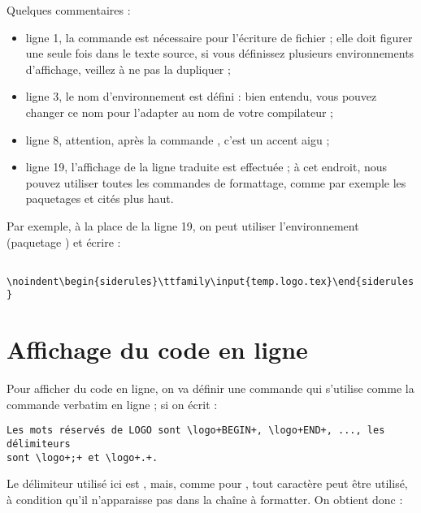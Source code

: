 Quelques commentaires :
\begin{itemize}
  \item ligne 1, la commande  est nécessaire pour l'écriture de fichier ; elle doit figurer une seule fois dans le texte source, si vous définissez plusieurs environnements d'affichage, veillez à ne pas la dupliquer ; 
  \item ligne 3, le nom d'environnement est défini : bien entendu, vous pouvez changer ce nom pour l'adapter au nom de votre compilateur ;
  \item ligne 8, attention, après la commande , c'est un accent aigu \tpp{\`{}} ;
  \item ligne 19, l'affichage de la ligne traduite est effectuée ; à cet endroit, nous pouvez utiliser toutes les commandes de formattage, comme par exemple les paquetages  et  cités plus haut.
\end{itemize}

Par exemple, à la place de la ligne 19, on peut utiliser l'environnement  (paquetage ) et écrire :

\texttt{
\textbackslash noindent\textbackslash begin\{siderules\}\textbackslash ttfamily\textbackslash input\{temp.logo.tex\}\textbackslash end\{siderules\}
}












\section{Affichage du code en ligne}

Pour afficher du code en ligne, on va définir une commande  qui s'utilise comme la commande verbatim en ligne  ; si on écrit :

\begin{verbatim}
Les mots réservés de LOGO sont \logo+BEGIN+, \logo+END+, ..., les délimiteurs
sont \logo+;+ et \logo+.+.
\end{verbatim}

Le délimiteur utilisé ici est \tpp{+}, mais, comme pour , tout caractère peut être utilisé, à condition qu'il n'apparaisse pas dans la chaîne à formatter. On obtient donc :

